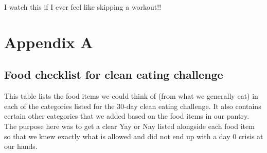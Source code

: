 \documentclass[
  oneside]{book}
\begin{document}
I watch this if I ever feel like skipping a workout!!

\hypertarget{appendix-a}{%
\chapter{Appendix A}\label{appendix-a}}

\hypertarget{food-checklist-for-clean-eating-challenge}{%
\section{Food checklist for clean eating challenge}\label{food-checklist-for-clean-eating-challenge}}

This table lists the food items we could think of (from what we generally eat) in each of the categories listed for the 30-day clean eating challenge. It also contains certain other categories that we added based on the food items in our pantry. The purpose here was to get a clear Yay or Nay listed alongside each food item so that we knew exactly what is allowed and did not end up with a day 0 crisis at our hands.
\end{document}
